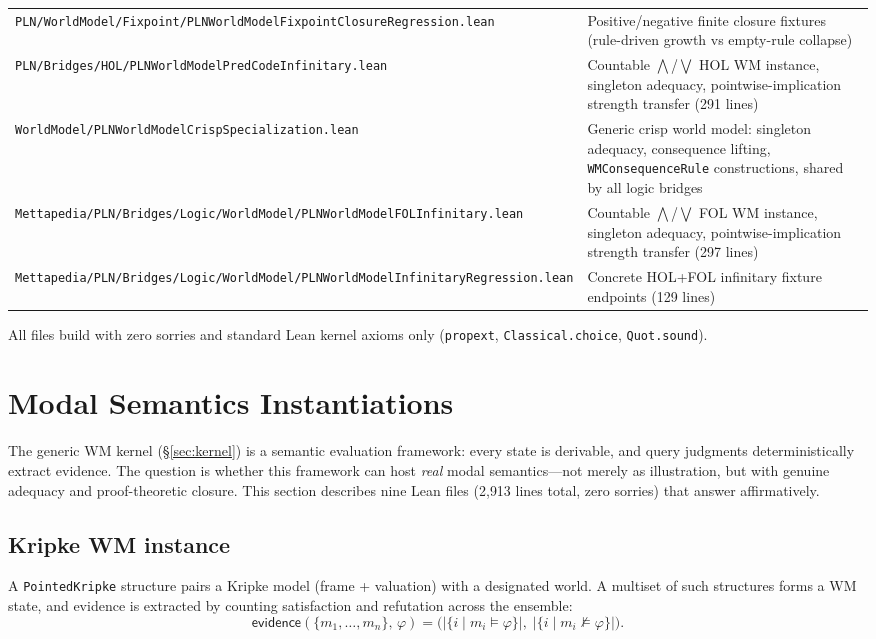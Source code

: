 \documentclass[]{article}
\newcommand{\code}[1]{\texttt{#1}}
\newcommand{\ev}{\mathsf{evidence}}
\begin{document}
\begin{longtable}{p{}p{}}
\code{PLN/WorldModel/Fixpoint/PLNWorldModelFixpointClosureRegression.lean} &
  Positive/negative finite closure fixtures (rule-driven growth vs empty-rule collapse) \\
\code{PLN/Bridges/HOL/PLNWorldModelPredCodeInfinitary.lean} &
  Countable $\bigwedge$/$\bigvee$ HOL WM instance, singleton adequacy,
  pointwise-implication strength transfer (291 lines) \\
\code{WorldModel/PLNWorldModelCrispSpecialization.lean} &
  Generic crisp world model: singleton adequacy, consequence lifting,
  \code{WMConsequenceRule} constructions, shared by all logic bridges \\
\code{Mettapedia/PLN/Bridges/Logic/WorldModel/PLNWorldModelFOLInfinitary.lean} &
  Countable $\bigwedge$/$\bigvee$ FOL WM instance, singleton adequacy,
  pointwise-implication strength transfer (297 lines) \\
\code{Mettapedia/PLN/Bridges/Logic/WorldModel/PLNWorldModelInfinitaryRegression.lean} &
  Concrete HOL+FOL infinitary fixture endpoints (129 lines) \\
\hline
\end{longtable}

All files build with zero sorries and standard Lean kernel axioms only
(\code{propext}, \code{Classical.choice}, \code{Quot.sound}).


\section{Modal Semantics Instantiations}
\label{sec:modal}

The generic WM kernel (\S\ref{sec:kernel}) is a semantic evaluation
framework: every state is derivable, and query judgments deterministically
extract evidence. The question is whether this framework can host
\emph{real} modal semantics---not merely as illustration, but with genuine
adequacy and proof-theoretic closure. This section describes nine Lean
files (2{,}913 lines total, zero sorries) that answer affirmatively.


\subsection{Kripke WM instance}
\label{sec:kripke-wm}

A \code{PointedKripke} structure pairs a Kripke model (frame + valuation)
with a designated world. A multiset of such structures forms a WM state,
and evidence is extracted by counting satisfaction and refutation across
the ensemble:
\[
  \ev(\{m_1,\ldots,m_n\},\,\varphi)
  = \bigl(|\{i \mid m_i \models \varphi\}|,\;
         |\{i \mid m_i \not\models \varphi\}|\bigr).
\]
\end{document}

